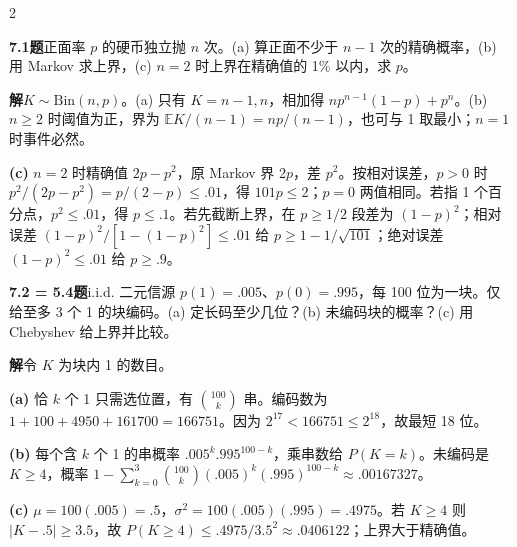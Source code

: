 \documentclass[a4paper]{article}
\newcommand{\cols}{2}
\newcommand{\cols}{4}
\newcommand{\topic}[1]{\par\addvspace{2.6pt}{\color{ink}\bfseries #1}\par\nobreak}
\newcommand{\problem}[2]{\par\addvspace{1.4pt}\textcolor{ink}{\textbf{#1}}\enspace\textbf{题}\enspace #2\par\nobreak}
\newcommand{\solve}{\noindent\textbf{解}\enspace}
\newcommand{\parta}[1]{\par\noindent\textbf{(#1)}\enspace}
\newcommand{\E}{\mathbb E}
\begin{document}
\begin{multicols}{\cols}
\topic{Tut 7 · AEP、计数与定长编码}
\problem{7.1}{正面率 $p$ 的硬币独立抛 $n$ 次。(a) 算正面不少于 $n-1$ 次的精确概率，(b) 用 Markov 求上界，(c) $n=2$ 时上界在精确值的 1\% 以内，求 $p$。}
\solve $K\sim\mathrm{Bin}(n,p)$。(a) 只有 $K=n-1,n$，相加得 $np^{n-1}(1-p)+p^n$。(b) $n\ge2$ 时阈值为正，界为 $\E K/(n-1)=np/(n-1)$，也可与 1 取最小；$n=1$ 时事件必然。
\parta{c} $n=2$ 时精确值 $2p-p^2$，原 Markov 界 $2p$，差 $p^2$。按相对误差，$p>0$ 时 $p^2/(2p-p^2)=p/(2-p)\le.01$，得 $101p\le2$；$p=0$ 两值相同。若指 1 个百分点，$p^2\le.01$，得 $p\le.1$。若先截断上界，在 $p\ge1/2$ 段差为 $(1-p)^2$；相对误差 $(1-p)^2/[1-(1-p)^2]\le.01$ 给 $p\ge1-1/\sqrt{101}$；绝对误差 $(1-p)^2\le.01$ 给 $p\ge.9$。
\problem{7.2 = 5.4}{i.i.d. 二元信源 $p(1)=.005$、$p(0)=.995$，每 100 位为一块。仅给至多 3 个 1 的块编码。(a) 定长码至少几位？(b) 未编码块的概率？(c) 用 Chebyshev 给上界并比较。}
\solve 令 $K$ 为块内 1 的数目。
\parta{a} 恰 $k$ 个 1 只需选位置，有 $\binom{100}k$ 串。编码数为 $1+100+4950+161700=166751$。因为 $2^{17}<166751\le2^{18}$，故最短 18 位。
\parta{b} 每个含 $k$ 个 1 的串概率 $.005^k .995^{100-k}$，乘串数给 $P(K=k)$。未编码是 $K\ge4$，概率 $1-\sum_{k=0}^3\binom{100}k(.005)^k(.995)^{100-k}\approx.00167327$。
\parta{c} $\mu=100(.005)=.5$，$\sigma^2=100(.005)(.995)=.4975$。若 $K\ge4$ 则 $|K-.5|\ge3.5$，故 $P(K\ge4)\le.4975/3.5^2\approx.0406122$；上界大于精确值。
\ifdefined\LargePrint\else
  \end{multicols}
  \newpage
\end{document}
